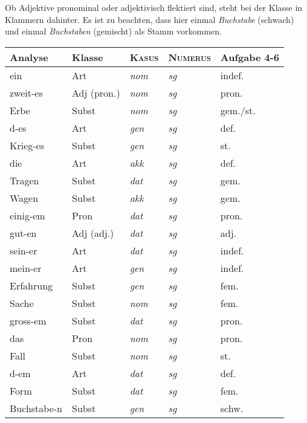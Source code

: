 

Ob Adjektive pronominal oder adjektivisch flektiert sind, steht bei der Klasse in Klammern dahinter.
Es ist zu beachten, dass hier einmal \textit{Buchstabe} (schwach) und einmal \textit{Buchstaben} (gemischt) als Stamm vorkommen.

\begin{center}
  \begin{tabular}{lllll}
    \lsptoprule
    \textbf{Analyse} & \textbf{Klasse} & \textbf{\textsc{Kasus}} & \textbf{\textsc{Numerus}} & \textbf{Aufgabe 4-6} \\
    \midrule
    ein & Art & \textit{nom} & \textit{sg} & indef. \\
    zweit-es & Adj (pron.) & \textit{nom} & \textit{sg} & pron. \\
    Erbe & Subst & \textit{nom} & \textit{sg} & gem./st. \\
    d-es & Art & \textit{gen} & \textit{sg} & def. \\
    Krieg-es & Subst & \textit{gen} & \textit{sg} & st. \\
    die & Art & \textit{akk} & \textit{sg} & def. \\
    Tragen & Subst & \textit{dat} & \textit{sg} & gem. \\
    Wagen & Subst & \textit{akk} & \textit{sg} & gem. \\
    einig-em & Pron & \textit{dat} & \textit{sg} & pron. \\
    gut-en & Adj (adj.) & \textit{dat} & \textit{sg} & adj. \\
    sein-er & Art & \textit{dat} & \textit{sg} & indef. \\
    mein-er & Art & \textit{gen} & \textit{sg} & indef. \\
    Erfahrung & Subst & \textit{gen} & \textit{sg} & fem. \\
    Sache & Subst & \textit{nom} & \textit{sg} & fem. \\
    gross-em & Subst & \textit{dat} & \textit{sg} & pron. \\
    das & Pron & \textit{nom} & \textit{sg} & pron. \\
    Fall & Subst & \textit{nom} & \textit{sg} & st. \\
    d-em & Art & \textit{dat} & \textit{sg} & def. \\
    Form & Subst & \textit{dat} & \textit{sg} & fem. \\
    Buchstabe-n & Subst & \textit{gen} & \textit{sg} & schw. \\

\end{tabular}
\end{center}
